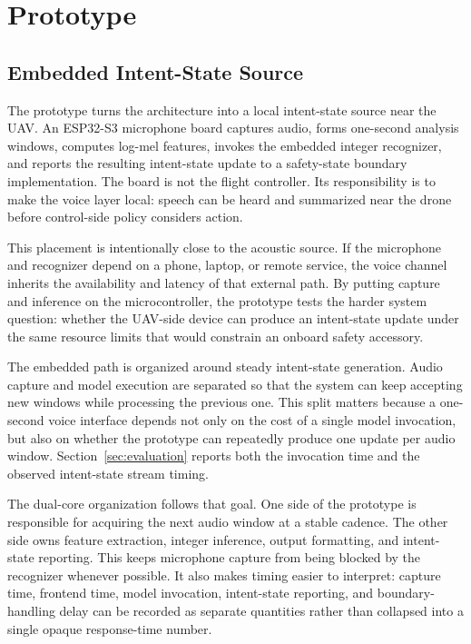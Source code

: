 \section{Prototype}
\label{sec:prototype}

\subsection{Embedded Intent-State Source}

The prototype turns the architecture into a local intent-state source near the UAV. An ESP32-S3 microphone board captures audio, forms one-second analysis windows, computes log-mel features, invokes the embedded integer recognizer, and reports the resulting intent-state update to a safety-state boundary implementation. The board is not the flight controller. Its responsibility is to make the voice layer local: speech can be heard and summarized near the drone before control-side policy considers action.

This placement is intentionally close to the acoustic source. If the microphone and recognizer depend on a phone, laptop, or remote service, the voice channel inherits the availability and latency of that external path. By putting capture and inference on the microcontroller, the prototype tests the harder system question: whether the UAV-side device can produce an intent-state update under the same resource limits that would constrain an onboard safety accessory.

The embedded path is organized around steady intent-state generation. Audio capture and model execution are separated so that the system can keep accepting new windows while processing the previous one. This split matters because a one-second voice interface depends not only on the cost of a single model invocation, but also on whether the prototype can repeatedly produce one update per audio window. Section~\ref{sec:evaluation} reports both the invocation time and the observed intent-state stream timing.

The dual-core organization follows that goal. One side of the prototype is responsible for acquiring the next audio window at a stable cadence. The other side owns feature extraction, integer inference, output formatting, and intent-state reporting. This keeps microphone capture from being blocked by the recognizer whenever possible. It also makes timing easier to interpret: capture time, frontend time, model invocation, intent-state reporting, and boundary-handling delay can be recorded as separate quantities rather than collapsed into a single opaque response-time number.


